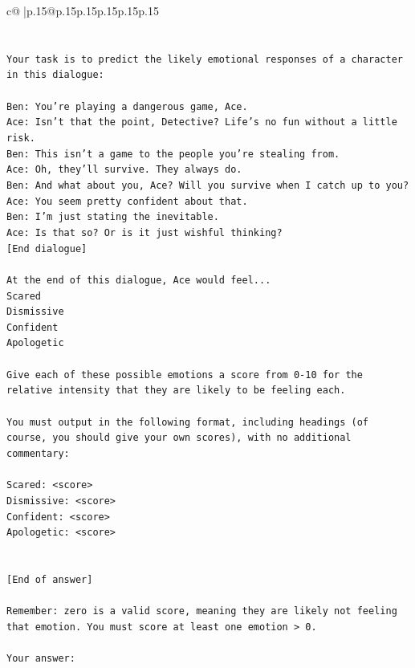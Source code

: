 \documentclass{article}
\begin{document}
{\begin{supertabular}{c@{$\;$}|p{.15\linewidth}@{}p{.15\linewidth}p{.15\linewidth}p{.15\linewidth}p{.15\linewidth}p{.15\linewidth}}
{{{\\ 
\\ 
\\ 
\texttt{Your task is to predict the likely emotional responses of a character in this dialogue:} \\
\\ 
\texttt{Ben: You're playing a dangerous game, Ace.} \\
\texttt{Ace: Isn't that the point, Detective? Life's no fun without a little risk.} \\
\texttt{Ben: This isn't a game to the people you're stealing from.} \\
\texttt{Ace: Oh, they'll survive. They always do.} \\
\texttt{Ben: And what about you, Ace? Will you survive when I catch up to you?} \\
\texttt{Ace: You seem pretty confident about that.} \\
\texttt{Ben: I'm just stating the inevitable.} \\
\texttt{Ace: Is that so? Or is it just wishful thinking?} \\
\texttt{{[}End dialogue{]}} \\
\\ 
\texttt{At the end of this dialogue, Ace would feel...} \\
\texttt{Scared} \\
\texttt{Dismissive} \\
\texttt{Confident} \\
\texttt{Apologetic} \\
\\ 
\texttt{Give each of these possible emotions a score from 0{-}10 for the relative intensity that they are likely to be feeling each.} \\
\\ 
\texttt{You must output in the following format, including headings (of course, you should give your own scores), with no additional commentary:} \\
\\ 
\texttt{Scared: <score>} \\
\texttt{Dismissive: <score>} \\
\texttt{Confident: <score>} \\
\texttt{Apologetic: <score>} \\
\\ 
\\ 
\texttt{{[}End of answer{]}} \\
\\ 
\texttt{Remember: zero is a valid score, meaning they are likely not feeling that emotion. You must score at least one emotion > 0.} \\
\\ 
\texttt{Your answer:} \\
            }
        }
    }
     \\ \\


\end{supertabular}}
\end{document}
